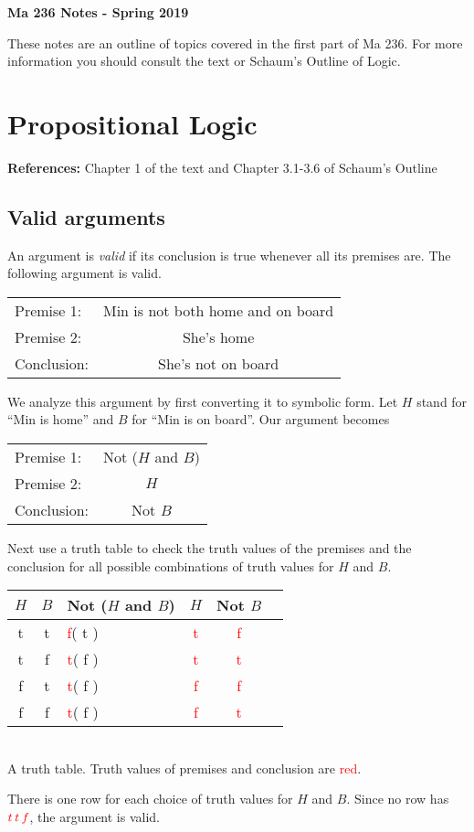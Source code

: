 \documentclass[letterpaper, 11pt]{article}
\newcommand{\red}[1]{\textcolor{red}{#1}}
\theoremstyle{definition}
\begin{document}
\centerline{\LARGE\bf Ma 236 Notes - Spring 2019}

\tableofcontents

\newpage


These notes are an outline of topics covered in the first part of Ma 236. For more information you should consult the text or Schaum's Outline of Logic.

\section{Propositional Logic}

{\bf References:} Chapter 1 of the text and Chapter 3.1-3.6 of Schaum's Outline

\subsection{Valid arguments}

An argument is {\em valid} if its conclusion is true whenever all its premises are. The following argument is valid. 

\begin{center}
\begin{tabular}{lc}
Premise 1:	& Min is not both home and on board\\
Premise 2:	& She's home\\ \hline
\rule{0pt}{12pt}Conclusion:	& She's not on board
\end{tabular}
\end{center}

We analyze this argument by first converting it to symbolic form. Let $H$ stand for ``Min is home'' and $B$ for ``Min is on board''. Our argument becomes

\begin{center}
\begin{tabular}{lc}
Premise 1:	& Not ($H$ and $B$)\\
Premise 2:	& $H$\\ \hline
\rule{0pt}{12pt}Conclusion:	& Not $B$
\end{tabular}
\end{center}

Next use a truth table to check the truth values of the premises and the conclusion for all possible combinations of truth values for $H$ and $B$.
\begin{center}
\begin{tabular}{cc|lccc}
 $H$ & $B$ & Not  ($H$ and $B$) & $H$ & Not $B$ \\\hline
 t & t & \quad\red{f}\quad\quad ( t ) &\red{t} &\red{f}\\
 t & f & \quad\red{t}\quad\quad ( f ) &\red{t} &\red{t}\\
 f & t & \quad\red{t}\quad\quad ( f ) &\red{f} &\red{f}\\
 f & f & \quad\red{t}\quad\quad ( f ) &\red{f} &\red{t}
\end{tabular}\\
A truth table. Truth values of premises and conclusion are \red{red}.
\end{center}
There is one row for each choice of truth values for $H$ and $B$. Since no row has $\textcolor{red}{t\,t\, f}$, the argument is valid. 
\end{document}
